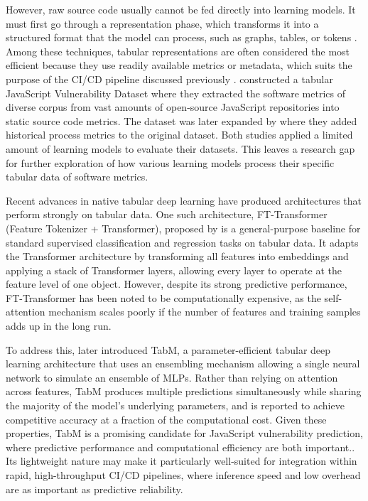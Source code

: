 However, raw source code usually cannot be fed directly into learning models. It must first go through a representation phase, which transforms it into a structured format that the model can process, such as graphs, tables, or tokens \citep{samoaa_systematic_2022}. Among these techniques, tabular representations are often considered the most efficient because they use readily available metrics or metadata, which suits the purpose of the CI/CD pipeline discussed previously \citep{prathuri_software_2026}. \citet{ferenc_challenging_2019} constructed a tabular JavaScript Vulnerability Dataset where they extracted the software metrics of diverse corpus from vast amounts of open-source JavaScript repositories into static source code metrics. The dataset was later expanded by \citet{viszkok_improving_2021} where they added historical process metrics to the original dataset. Both studies applied a limited amount of learning models to evaluate their datasets. This leaves a research gap for further exploration of how various learning models process their specific tabular data of software metrics.

Recent advances in native tabular deep learning have produced architectures that perform strongly on tabular data. One such architecture, FT-Transformer (Feature Tokenizer + Transformer), proposed by \citet{gorishniy_revisiting_2023} is a general-purpose baseline for standard supervised classification and regression tasks on tabular data. It adapts the Transformer architecture by transforming all features into embeddings and applying a stack of Transformer layers, allowing every layer to operate at the feature level of one object. However, despite its strong predictive performance, FT-Transformer has been noted to be computationally expensive, as the self-attention mechanism scales poorly if the number of features and training samples adds up in the long run.

To address this, \citet{gorishniy_tabm_2025} later introduced TabM, a parameter-efficient tabular deep learning architecture that uses an ensembling mechanism allowing a single neural network to simulate an ensemble of MLPs. Rather than relying on attention across features, TabM produces multiple predictions simultaneously while sharing the majority of the model's underlying parameters, and is reported to achieve competitive accuracy at a fraction of the computational cost. Given these properties, TabM is a promising candidate for JavaScript vulnerability prediction, where predictive performance and computational efficiency are both important.. Its lightweight nature may make it particularly well-suited for integration within rapid, high-throughput CI/CD pipelines, where inference speed and low overhead are as important as predictive reliability.

